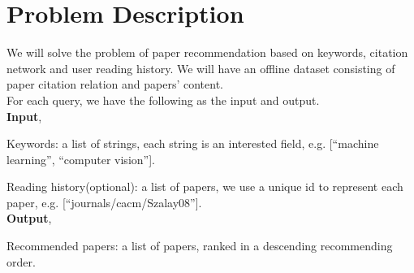 \section{Problem Description}

We will solve the problem of paper recommendation based on keywords, citation network and user reading history. 
We will have an offline dataset consisting of paper citation relation and papers' content. \\
For each query, we have the following as the input and output.\\
\textbf{Input}, 

Keywords: a list of strings, each string is an interested field, e.g. [``machine learning'', ``computer vision''].

Reading history(optional): a list of papers, we use a unique id to represent each paper, e.g. [``journals/cacm/Szalay08''].\\
\textbf{Output},

Recommended papers: a list of papers, ranked in a descending recommending order.

